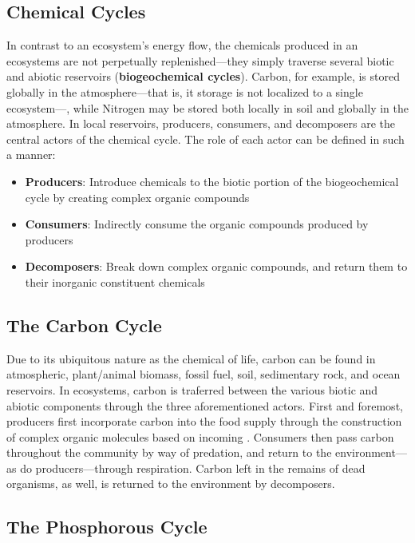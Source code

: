 \documentclass{article}
\begin{document}
\subsection{Chemical Cycles}

In contrast to an ecosystem's energy flow, the chemicals produced in an ecosystems
are not perpetually replenished---they simply traverse several biotic and abiotic
reservoirs (\textbf{biogeochemical cycles}). Carbon, for example, is stored globally
in the atmosphere---that is, it storage is not localized to a single ecosystem---,
while Nitrogen may be stored both locally in soil and globally in the atmosphere.
In local reservoirs, producers, consumers, and decomposers are the central actors
of the chemical cycle. The role of each actor can be defined in such a manner:

\begin{itemize}
	\item \textbf{Producers}: Introduce chemicals to the biotic portion of the
	biogeochemical cycle by creating complex organic compounds
	\item \textbf{Consumers}: Indirectly consume the organic compounds produced by
	producers
	\item \textbf{Decomposers}: Break down complex organic compounds, and return
	them to their inorganic constituent chemicals
\end{itemize}

\subsection{The Carbon Cycle}

Due to its ubiquitous nature as the chemical of life, carbon can be found in
atmospheric, plant/animal biomass, fossil fuel, soil, sedimentary rock, and
ocean reservoirs. In ecosystems, carbon is traferred between the various
biotic and abiotic components through the three aforementioned actors.
First and foremost, producers first incorporate carbon into the food supply
through the construction of complex organic molecules based on incoming .
Consumers then pass carbon throughout the community by way of predation, and return
 to the environment---as do producers---through respiration. Carbon left
in the remains of dead organisms, as well, is returned to the environment by
decomposers.

\subsection{The Phosphorous Cycle}
\end{document}
